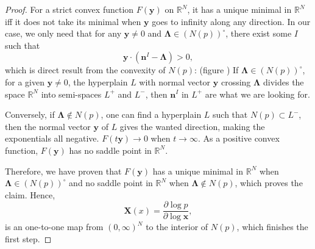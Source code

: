 \documentclass[12pt]{article}
\theoremstyle{definition}
\theoremstyle{plain}
\begin{document}
\begin{proof}
For a strict convex function $F(\mathbf y)$ on $\mathbb R^N$, it has a unique minimal in $\mathbb R^N$ iff it does not take its minimal when $\mathbf{y}$ goes to infinity along any direction. In our case, we only need that for any $\mathbf{y}\neq 0$ and $\mathbf\Lambda \in (N(p))^\circ $, there exist some $I$ such that  
\[
	\mathbf{y}\cdot (\mathbf{n}^I-\mathbf{\Lambda})>0,
\]
which is direct result from the convexity of $N(p)$: (figure \cite{}) If $\mathbf\Lambda \in (N(p))^\circ$, for a given $\mathbf y\neq 0$, the hyperplain $L$ with normal vector $\mathbf y$ crossing $\mathbf \Lambda$ divides the space $\mathbb R^N$ into semi-spaces $L^+$ and $L^-$, then $\mathbf{n}^I$ in $L^+$ are what we are looking for.

\begin{figure}[htbp]
\centering
{}
\end{figure}
Conversely, if $\mathbf\Lambda \not\in N(p)$, one can find a hyperplain $L$ such that $N(p)\subset L^-$, then the normal vector $\mathbf{y}$ of $L$ gives the wanted direction, making the exponentials all negative. $F(t\mathbf y)\to 0$ when $t\to \infty$. As a positive convex function, $F(\mathbf y)$ has no saddle point in $\mathbb R^N$.

Therefore, we have proven that $F(\mathbf y)$ has a unique minimal in $\mathbb R^N$ when $\mathbf \Lambda \in (N(p))^\circ$ and no saddle point in $\mathbb R^N$ when $\mathbf \Lambda \not\in N(p)$, which proves the claim. Hence, 
\[
	\mathbf X(x)=\frac{\partial \log p}{\partial \log \mathbf x},
\]
is an one-to-one map from $(0,\infty)^N$ to the interior of $N(p)$, which finishes the first step.


\end{proof}
\end{document}

